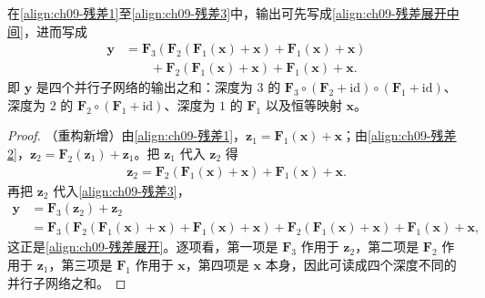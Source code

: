 \documentclass[../../main.tex]{subfiles}
\begin{document}
\begin{proposition}[残差网络的展开]\label{proposition:ch09-残差展开}
在\eqref{align:ch09-残差1}至\eqref{align:ch09-残差3}中，输出可先写成\eqref{align:ch09-残差展开中间}，进而写成
\begin{align}
\boldsymbol{y}
&=\boldsymbol{F}_{3}\!\left(\boldsymbol{F}_{2}\!\left(\boldsymbol{F}_{1}(\boldsymbol{x})+\boldsymbol{x}\right)+\boldsymbol{F}_{1}(\boldsymbol{x})+\boldsymbol{x}\right)\nonumber\\
&\qquad+\boldsymbol{F}_{2}\!\left(\boldsymbol{F}_{1}(\boldsymbol{x})+\boldsymbol{x}\right)+\boldsymbol{F}_{1}(\boldsymbol{x})+\boldsymbol{x}.
\label{align:ch09-残差展开}
\end{align}
即 $\boldsymbol{y}$ 是四个并行子网络的输出之和：深度为 $3$ 的 $\boldsymbol{F}_{3}\circ(\boldsymbol{F}_{2}+\mathrm{id})\circ(\boldsymbol{F}_{1}+\mathrm{id})$、深度为 $2$ 的 $\boldsymbol{F}_{2}\circ(\boldsymbol{F}_{1}+\mathrm{id})$、深度为 $1$ 的 $\boldsymbol{F}_{1}$ 以及恒等映射 $\boldsymbol{x}$。
\end{proposition}

\begin{proof}
（重构新增）由\eqref{align:ch09-残差1}，$\boldsymbol{z}_{1}=\boldsymbol{F}_{1}(\boldsymbol{x})+\boldsymbol{x}$；由\eqref{align:ch09-残差2}，$\boldsymbol{z}_{2}=\boldsymbol{F}_{2}(\boldsymbol{z}_{1})+\boldsymbol{z}_{1}$。把 $\boldsymbol{z}_{1}$ 代入 $\boldsymbol{z}_{2}$ 得
\begin{align*}
\boldsymbol{z}_{2}=\boldsymbol{F}_{2}\!\left(\boldsymbol{F}_{1}(\boldsymbol{x})+\boldsymbol{x}\right)+\boldsymbol{F}_{1}(\boldsymbol{x})+\boldsymbol{x}.
\end{align*}
再把 $\boldsymbol{z}_{2}$ 代入\eqref{align:ch09-残差3}，
\begin{align*}
\boldsymbol{y}&=\boldsymbol{F}_{3}(\boldsymbol{z}_{2})+\boldsymbol{z}_{2}\\
&=\boldsymbol{F}_{3}\!\left(\boldsymbol{F}_{2}\!\left(\boldsymbol{F}_{1}(\boldsymbol{x})+\boldsymbol{x}\right)+\boldsymbol{F}_{1}(\boldsymbol{x})+\boldsymbol{x}\right)+\boldsymbol{F}_{2}\!\left(\boldsymbol{F}_{1}(\boldsymbol{x})+\boldsymbol{x}\right)+\boldsymbol{F}_{1}(\boldsymbol{x})+\boldsymbol{x},
\end{align*}
这正是\eqref{align:ch09-残差展开}。逐项看，第一项是 $\boldsymbol{F}_{3}$ 作用于 $\boldsymbol{z}_{2}$，第二项是 $\boldsymbol{F}_{2}$ 作用于 $\boldsymbol{z}_{1}$，第三项是 $\boldsymbol{F}_{1}$ 作用于 $\boldsymbol{x}$，第四项是 $\boldsymbol{x}$ 本身，因此可读成四个深度不同的并行子网络之和。
\end{proof}
\end{document}
